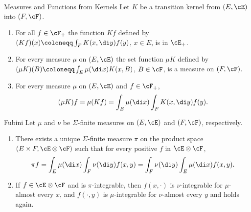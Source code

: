 \begin{thm}{Measures and Functions from Kernels}{}
	Let $K$ be a transition kernel from $(E, \cE)$ into $(F, \cF)$.
	\begin{enumerate}
		\item For all $f \in \cF_+$ the function $Kf$ defined by $(Kf)(x) \coloneqq \int_F K(x, \di y) f(y)$, $x \in E$, is in $\cE_+$.
		\item For every measure $\mu$ on $(E, \cE)$ the set function $\mu K$ defined by $(\mu K)(B) \coloneqq \int_E \mu(\di x) K(x, B)$, $B \in \cF$, is a measure on $(F, \cF)$.
		\item For every measure $\mu$ on $(E, \cE)$ and $f \in \cF_+$,
		      \begin{equation*}
			      (\mu K) f = \mu (K f) = \int_E \mu(\di x) \int_F K(x, \di y) f(y).
		      \end{equation*}
	\end{enumerate}
\end{thm}

\begin{thm}{Fubini}{}
	Let $\mu$ and $\nu$ be $\Sigma$-finite measures on $(E, \cE)$ and $(F, \cF)$, respectively.
	\begin{enumerate}
		\item There exists a unique $\Sigma$-finite measure $\pi$ on the product space $(E \times F, \cE \otimes \cF)$ such that for every positive $f$ in $\cE \otimes \cF$,
		      \begin{equation}
			      \pi f = \int_E \mu(\di x) \int_F \nu(\di y) f(x, y) = \int_F \nu(\di y) \int_E \mu(\di x) f(x, y).
			      \label{eq:FubiniIntegral}
		      \end{equation}
		\item If $f \in \cE \otimes \cF$ and is $\pi$-integrable, then $f(x, \cdot)$ is $\nu$-integrable for $\mu$-almost every $x$, and $f(\cdot, y)$ is $\mu$-integrable for $\nu$-almost every $y$ and  holds again.
	\end{enumerate}
\end{thm}
